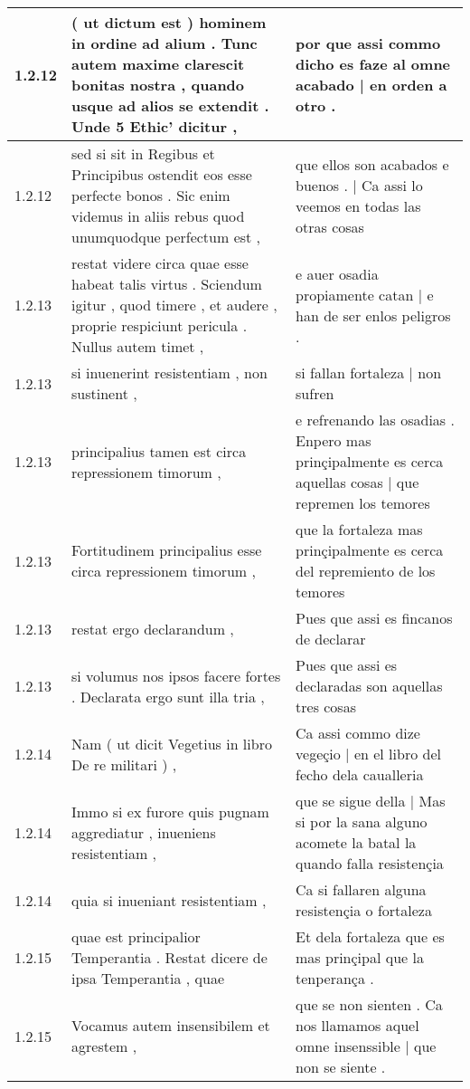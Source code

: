 \begin{tabular}{|p{1cm}|p{6.5cm}|p{6.5cm}|}
1.2.12 & ( ut dictum est ) hominem in ordine ad alium . Tunc autem maxime clarescit bonitas nostra , quando usque ad alios se extendit . Unde 5 Ethic’ dicitur , & por que assi commo dicho es faze al omne acabado | en orden a otro . \\\hline
1.2.12 & sed si sit in Regibus et Principibus ostendit eos esse perfecte bonos . Sic enim videmus in aliis rebus quod unumquodque perfectum est , & que ellos son acabados e buenos . | Ca assi lo veemos en todas las otras cosas \\\hline
1.2.13 & restat videre circa quae esse habeat talis virtus . Sciendum igitur , quod timere , et audere , proprie respiciunt pericula . Nullus autem timet , & e auer osadia propiamente catan | e han de ser enlos peligros . \\\hline
1.2.13 & si inuenerint resistentiam , non sustinent , & si fallan fortaleza | non sufren \\\hline
1.2.13 & principalius tamen est circa repressionem timorum , & e refrenando las osadias . Enpero mas prinçipalmente es cerca aquellas cosas | que repremen los temores \\\hline
1.2.13 & Fortitudinem principalius esse circa repressionem timorum , & que la fortaleza mas prinçipalmente es cerca del repremiento de los temores \\\hline
1.2.13 & restat ergo declarandum , & Pues que assi es fincanos de declarar \\\hline
1.2.13 & si volumus nos ipsos facere fortes . Declarata ergo sunt illa tria , & Pues que assi es declaradas son aquellas tres cosas \\\hline
1.2.14 & Nam ( ut dicit Vegetius in libro De re militari ) , & Ca assi commo dize vegeçio | en el libro del fecho dela caualleria \\\hline
1.2.14 & Immo si ex furore quis pugnam aggrediatur , inueniens resistentiam , & que se sigue della | Mas si por la sana alguno acomete la batal la quando falla resistençia \\\hline
1.2.14 & quia si inueniant resistentiam , & Ca si fallaren alguna resistençia o fortaleza \\\hline
1.2.15 & quae est principalior Temperantia . Restat dicere de ipsa Temperantia , quae & Et dela fortaleza que es mas prinçipal que la tenperança . \\\hline
1.2.15 & Vocamus autem insensibilem et agrestem , & que se non sienten . Ca nos llamamos aquel omne insenssible | que non se siente . \\\hline

\end{tabular}
